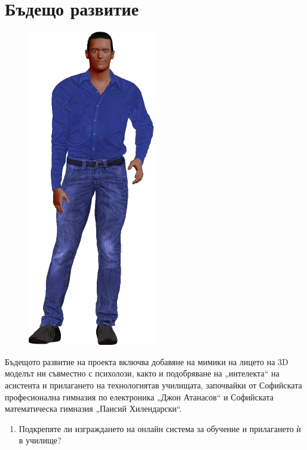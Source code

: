 \documentclass[a4paper, 12pt]{article}
\newenvironment{myblock}[1]
  {\begin{tcolorbox}[colback=green!5,colframe=green!40!black,title=#1]}
  {\end{tcolorbox}}
\begin{document}
	\section{Бъдещо развитие}
	\begin{figure}
		\includegraphics[scale=0.35]{../bad_boy.png}
	\end{figure}
	Бъдещото развитие на проекта включва добавяне на мимики на лицето на 3D моделът ни съвместно с психолози, както и подобряване на „интелекта“ на асистента и прилагането на технологиятав училищата, започвайки от Софийската професионална гимназия по електроника „Джон Атанасов“ и Софийската математическа гимназия „Паисий Хилендарски“. \\ \vspace{0.5cm}
	\begin{center}
		\begin{myblock}{Въпроси от анкета}
			\begin{enumerate}
				\item Подкрепяте ли изграждането на онлайн система за обучение и прилагането ѝ в училище?
			\end{enumerate}
		\end{myblock}
	\end{center}
\end{document}
